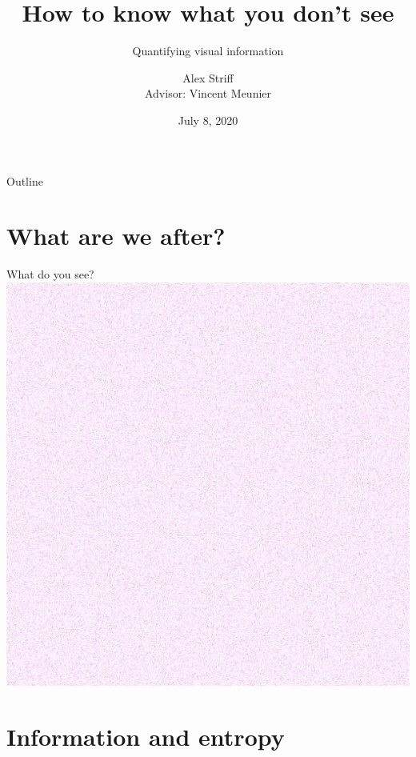 \documentclass[14pt,c]{beamer}
\title{How to know what you don't see}
\subtitle{Quantifying visual information}
\author{Alex Striff \\ Advisor: Vincent Meunier}
\institute{Reed College}
\date{July 8, 2020}
\begin{document}
\frame{\titlepage}

\begin{frame}{Outline}
  \centering
  \tableofcontents
\end{frame}

\section{What are we after?}

\begin{frame}{What do you see?}
  \centering
  \includegraphics[angle=1]{rect-lchnoise}
\end{frame}

\section{Information and entropy}
\end{document}
